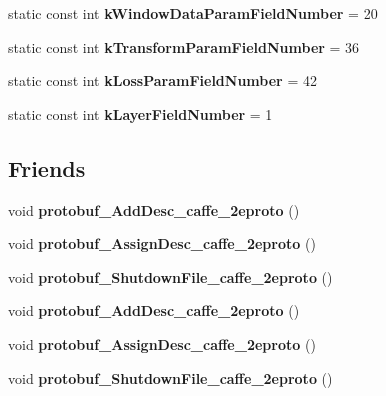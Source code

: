 \begin{DoxyCompactItemize}
\mbox{\label{classcaffe_1_1_v1_layer_parameter_aa8255ea847163efa2cdf01b1833a6577}} 
static const int {\bfseries k\+Window\+Data\+Param\+Field\+Number} = 20
\item 
\mbox{\label{classcaffe_1_1_v1_layer_parameter_a9a741ed8302d4f0782277451a53aac14}} 
static const int {\bfseries k\+Transform\+Param\+Field\+Number} = 36
\item 
\mbox{\label{classcaffe_1_1_v1_layer_parameter_ae988e94b549c28578af8c53c88af1c27}} 
static const int {\bfseries k\+Loss\+Param\+Field\+Number} = 42
\item 
\mbox{\label{classcaffe_1_1_v1_layer_parameter_a8f3402cb53641de55151df2907bafd2a}} 
static const int {\bfseries k\+Layer\+Field\+Number} = 1
\end{DoxyCompactItemize}
\subsection*{Friends}
\begin{DoxyCompactItemize}
\item 
\mbox{\label{classcaffe_1_1_v1_layer_parameter_a2670a9c8ffd0e5105cf7522cd6f8613d}} 
void {\bfseries protobuf\+\_\+\+Add\+Desc\+\_\+caffe\+\_\+2eproto} ()
\item 
\mbox{\label{classcaffe_1_1_v1_layer_parameter_a7f145bddbdde78003d27e42c7e003d23}} 
void {\bfseries protobuf\+\_\+\+Assign\+Desc\+\_\+caffe\+\_\+2eproto} ()
\item 
\mbox{\label{classcaffe_1_1_v1_layer_parameter_a026784a8e4e76f1b4daf9d033d2ece83}} 
void {\bfseries protobuf\+\_\+\+Shutdown\+File\+\_\+caffe\+\_\+2eproto} ()
\item 
\mbox{\label{classcaffe_1_1_v1_layer_parameter_a2670a9c8ffd0e5105cf7522cd6f8613d}} 
void {\bfseries protobuf\+\_\+\+Add\+Desc\+\_\+caffe\+\_\+2eproto} ()
\item 
\mbox{\label{classcaffe_1_1_v1_layer_parameter_a7f145bddbdde78003d27e42c7e003d23}} 
void {\bfseries protobuf\+\_\+\+Assign\+Desc\+\_\+caffe\+\_\+2eproto} ()
\item 
\mbox{\label{classcaffe_1_1_v1_layer_parameter_a026784a8e4e76f1b4daf9d033d2ece83}} 
void {\bfseries protobuf\+\_\+\+Shutdown\+File\+\_\+caffe\+\_\+2eproto} ()
\end{DoxyCompactItemize}


